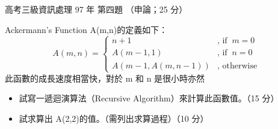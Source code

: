 \begin{pastexam}[label={px:gk3-097-ds-04}]{高考三級資訊處理 97 年 第四題}
（申論；25 分）

Ackermann's Function A(m,n)的定義如下：
\[
A(m, n) = \begin{cases}
n + 1 & \text{, if } \ m = 0 \\
A(m - 1, 1) & \text{, if } \ n = 0 \\
A(m - 1, A(m, n - 1)) & \text{, otherwise}
\end{cases}
\]
此函數的成長速度相當快，對於 m 和 n 是很小時亦然
\begin{itemize}[leftmargin=2.2em, nosep]
\item[㈠] 試寫一遞迴演算法（Recursive Algorithm）來計算此函數值。（15 分）
\item[㈡] 試求算出 A(2,2)的值。（需列出求算過程）（10 分）
\end{itemize}
\end{pastexam}

